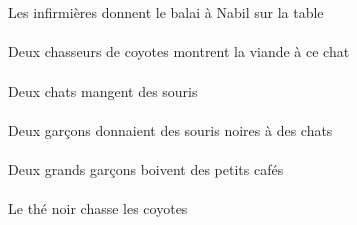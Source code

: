 \begin{exe}
\ex\gll
\DEFSgObl{}   \tableCSgObl{}   \SUR{}   \DEFPlErg{}   \infirmiereBPlErg{}    \INDSgDat{}   \NabilBSgDat{}   \DEFSgAbs{}   \balaiCSgAbs{}  \donnerVdPrsCSg{}\\
\DEFSgOblP{}   \tableCSgOblP{}   \SURP{}   \DEFPlErgP{}   \infirmiereBPlErgP{}    \INDSgDatP{}   \NabilBSgDatP{}   \DEFSgAbsP{}   \balaiCSgAbsP{}  \donnerVdPrsCSgP{}\\
Les infirmières donnent le balai à Nabil sur la table
\ex\gll
\INDDuErg{}    \INDPlObl{}   \coyoteAPlObl{}   \DE{}   \chasseurCDuErg{}    \DEMSgDat{}   \chatDSgDat{}   \DEFSgAbs{}   \viandeASgAbs{}  \montrerVdPrsASg{}\\
\INDDuErgP{}    \INDPlOblP{}   \coyoteAPlOblP{}   \DEP{}   \chasseurCDuErgP{}    \DEMSgDatP{}   \chatDSgDatP{}   \DEFSgAbsP{}   \viandeASgAbsP{}  \montrerVdPrsASgP{}\\
Deux chasseurs de coyotes montrent la viande à ce chat
\ex\gll
\INDDuErg{}   \chatDDuErg{}   \INDPlAbs{}   \sourisAPlAbs{}  \mangerVtPrsAPl{}\\
\INDDuErgP{}   \chatDDuErgP{}   \INDPlAbsP{}   \sourisAPlAbsP{}  \mangerVtPrsAPlP{}\\
Deux chats mangent des souris
\ex\gll
\INDDuErg{}   \garconBDuErg{}    \INDPlDat{}   \chatDPlDat{}   \INDPlAbs{}   \noirAPl{}   \sourisAPlAbs{}  \donnerVdPstAPl{}\\
\INDDuErgP{}   \garconBDuErgP{}    \INDPlDatP{}   \chatDPlDatP{}   \INDPlAbsP{}   \noirAPlP{}   \sourisAPlAbsP{}  \donnerVdPstAPlP{}\\
Deux garçons donnaient des souris noires à des chats
\ex\gll
\INDDuErg{}   \grandBDu{}   \garconBDuErg{}   \INDPlAbs{}   \petitDPl{}   \cafeDPlAbs{}  \boireVtPrsDPl{}\\
\INDDuErgP{}   \grandBDuP{}   \garconBDuErgP{}   \INDPlAbsP{}   \petitDPlP{}   \cafeDPlAbsP{}  \boireVtPrsDPlP{}\\
Deux grands garçons boivent des petits cafés
\ex\gll
\DEFSgErg{}   \noirBSg{}   \theBSgErg{}   \DEFPlAbs{}   \coyoteAPlAbs{}  \chasserVtPrsAPl{}\\
\DEFSgErgP{}   \noirBSgP{}   \theBSgErgP{}   \DEFPlAbsP{}   \coyoteAPlAbsP{}  \chasserVtPrsAPlP{}\\
Le thé noir chasse les coyotes
\ex\gll
\DEMPlErg{}   \troisCPl{}   \chasseurCPlErg{}    \DEFSgDat{}   \petitBSg{}   \blancBSg{}   \garconBSgDat{}   \INDDuAbs{}    \DEFPlObl{}   \plaineCPlObl{}   \DE{}   \autrucheDDuAbs{}  \offrirVdPstDDu{}\\
\DEMPlErgP{}   \troisCPlP{}   \chasseurCPlErgP{}    \DEFSgDatP{}   \petitBSgP{}   \blancBSgP{}   \garconBSgDatP{}   \INDDuAbsP{}    \DEFPlOblP{}   \plaineCPlOblP{}   \DEP{}   \autrucheDDuAbsP{}  \offrirVdPstDDuP{}\\

\end{exe}
